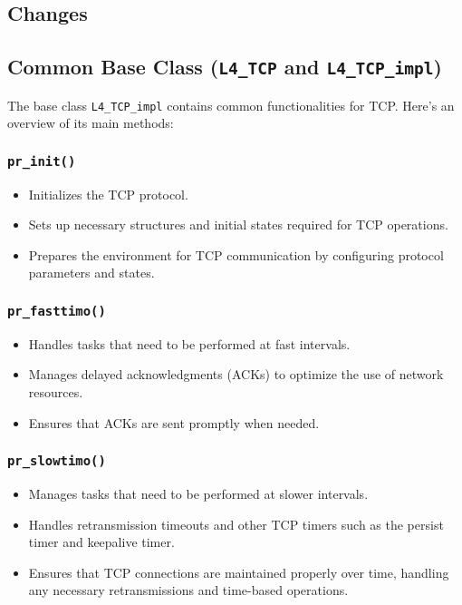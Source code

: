 \subsection*{\Large \textbf{Changes}}
\subsection{Common Base Class (\texttt{L4\_TCP} and \texttt{L4\_TCP\_impl})}
The base class \texttt{L4\_TCP\_impl} contains common functionalities for TCP. Here's an overview of its main methods:

\subsubsection{\texttt{\large pr\_init()}}
\begin{itemize}
    \item Initializes the TCP protocol.
    \item Sets up necessary structures and initial states required for TCP operations.
    \item Prepares the environment for TCP communication by configuring protocol parameters and states.
\end{itemize}

\subsubsection{\texttt{\large pr\_fasttimo()}}
\begin{itemize}
    \item Handles tasks that need to be performed at fast intervals.
    \item Manages delayed acknowledgments (ACKs) to optimize the use of network resources.
    \item Ensures that ACKs are sent promptly when needed.
\end{itemize}

\subsubsection{\texttt{\large pr\_slowtimo()}}
\begin{itemize}
    \item Manages tasks that need to be performed at slower intervals.
    \item Handles retransmission timeouts and other TCP timers such as the persist timer and keepalive timer.
    \item Ensures that TCP connections are maintained properly over time, handling any necessary retransmissions and time-based operations.
\end{itemize}

